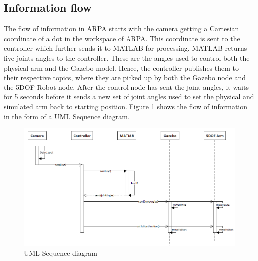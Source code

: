 \documentclass[11pt,a4paper]{report}
\begin{document}
	\subsection{Information flow}
	
	The flow of information in ARPA starts with the camera getting a Cartesian coordinate of a dot in the workspace of ARPA. This coordinate is sent to the controller which further sends it to MATLAB for processing. MATLAB returns five joints angles to the controller. These are the angles used to control both the physical arm and the Gazebo model. Hence, the controller publishes them to their respective topics, where they are picked up by both the Gazebo node and the 5DOF Robot node. After the control node has sent the joint angles, it waits for 5 seconds before it sends a new set of joint angles used to set the physical and simulated arm back to starting position. Figure \ref{fig:seq-diagram} shows the flow of information in the form of a UML Sequence diagram.
	
	
	\begin{figure}[ht]
		\includegraphics[width=\linewidth]{../Diagrams/SequenceDiagram.png}
		\caption{UML Sequence diagram}
		\label{fig:seq-diagram}
	\end{figure}
	
	
	
	
	
\end{document}
